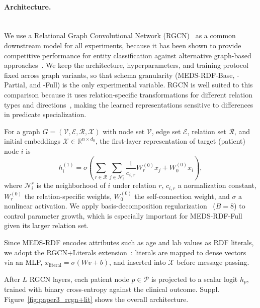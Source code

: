 \paragraph{Architecture.}\mbox{}\\

We use a Relational Graph Convolutional Network (RGCN)~\cite{schlichtkrull_2018} as a common downstream model for all experiments, because it has been shown to provide competitive performance for entity classification against alternative graph-based approaches~\cite{schlichtkrull_2018}. We keep the architecture, hyperparameters, and training protocol fixed across graph variants, so that schema granularity (MEDS-RDF-Base, -Partial, and -Full) is the only experimental variable. RGCN is well suited to this comparison because it uses relation-specific transformations for different relation types and directions~\cite{schlichtkrull_2018}, making the learned representations sensitive to differences in predicate specialization.

For a graph $G = (\mathcal{V}, \mathcal{E}, \mathcal{R}, \mathcal{X})$ with node set $\mathcal{V}$, edge set $\mathcal{E}$, relation set $\mathcal{R}$, and initial embeddings $\mathcal{X} \in \mathbb{R}^{n \times d_0}$, the first-layer representation of target (patient) node $i$ is
\[
h_i^{(1)} =
\sigma
\left(
\sum_{r \in \mathcal{R}}
\sum_{j \in \mathcal{N}_i^r}
\frac{1}{c_{i,r}}
W_r^{(0)} x_j
+
W_0^{(0)} x_i
\right),
\]
where $\mathcal{N}_i^r$ is the neighborhood of $i$ under relation $r$, $c_{i,r}$ a normalization constant, $W_r^{(0)}$ the relation-specific weights, $W_0^{(0)}$ the self-connection weight, and $\sigma$ a nonlinear activation. We apply basis-decomposition regularization~\cite{schlichtkrull_2018} ($B=8$) to control parameter growth, which is especially important for MEDS-RDF-Full given its larger relation set. 

Since MEDS-RDF encodes attributes such as age and lab values as RDF literals, we adopt the RGCN+Literals extension~\cite{kristiadi_incorporating_2019}: literals are mapped to dense vectors via an MLP, $x_{\mathrm{literal}} = \sigma(Wv+b)$, and inserted into $\mathcal{X}$ before message passing.

After $L$ RGCN layers, each patient node $p \in \mathcal{P}$ is projected to a scalar logit $h_p$, trained with binary cross-entropy against the clinical outcome. Suppl. Figure~\ref{fig:paper3_rcgn+lit} shows the overall architecture.

